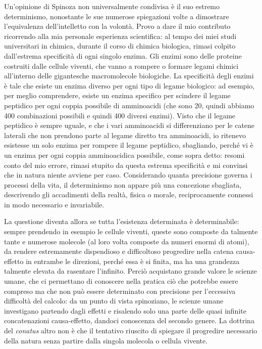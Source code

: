 Un'opinione di Spinoza non universalmente condivisa è il suo estremo determinismo, nonostante le sue numerose spiegazioni volte a dimostrare l'equivalenza dell'intelletto con la volontà. Provo a dare il mio contributo ricorrendo alla mia personale esperienza scientifica: al tempo dei miei studi universitari in chimica, durante il corso di chimica biologica, rimasi colpito dall'estrema specificità di ogni singolo enzima. Gli enzimi sono delle proteine costruiti dalle cellule viventi, che vanno a rompere o formare legami chimici all'interno delle gigantesche macromolecole biologiche. La specificità degli enzimi è tale che esiste un enzima diverso per ogni tipo di legame biologico: ad esempio, per meglio comprendere, esiste un enzima specifico per scindere il legame peptidico per ogni coppia possibile di amminoacidi (che sono 20, quindi abbiamo 400 combinazioni possibili e quindi 400 diversi enzimi). Visto che il legame peptidico è sempre uguale, e che i vari amminoacidi si differenziano per le catene laterali che non prendono parte al legame diretto tra amminoacidi, io ritenevo esistesse un solo enzima per rompere il legame peptidico, sbagliando, perché vi è un enzima per ogni coppia amminoacidica possibile, come sopra detto: resomi conto del mio errore, rimasi stupito da questa estrema specificità e mi convinsi che in natura niente avviene per caso. Considerando quanta precisione  governa i processi della vita, il determinismo  non appare più una concezione sbagliata, descrivendo gli accadimenti della realtà, fisica o morale, reciprocamente connessi in modo necessario e invariabile.

La questione diventa allora se tutta l'esistenza determinata è determinabile: sempre prendendo in esempio le cellule viventi, queste sono composte da talmente tante e numerose molecole (al loro volta composte da numeri enormi di atomi), da rendere estremamente dispendioso e difficoltoso progredire nella catena causa-effetto in entrambe le direzioni, perché essa è si finita, ma ha una grandezza talmente elevata da rasentare l'infinito. Perciò acquistano grande valore le scienze umane, che ci permettano di conoscere nella pratica ciò che potrebbe essere compreso ma che non può essere determinato con precisione per l'eccessiva difficoltà del calcolo: da un punto di vista spinoziano, le scienze umane investigano partendo dagli effetti e risalendo solo una parte delle quasi infinite concatenazioni causa-effetto, dandoci conoscenza del secondo genere. La dottrina del \textit{conatus} altro non è che il tentativo riuscito di spiegare il progredire necessario della natura senza partire dalla singola molecola  o cellula vivente.

